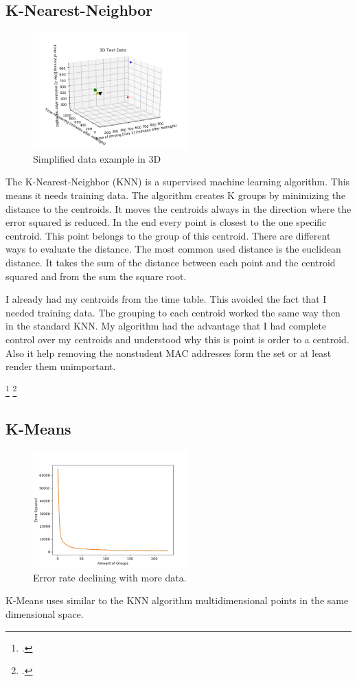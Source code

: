 \documentclass[11pt]{article}
\begin{document}
\subsection{K-Nearest-Neighbor}

\begin{figure}
\centering
\includegraphics [width = 6cm]{images/3Dploting.png}
\caption{Simplified data example in 3D\label{fig:3dploting}}
\end{figure}

The K-Nearest-Neighbor (KNN)  is a supervised machine learning algorithm. This means it needs training data. The algorithm creates K groups by minimizing the distance to the centroids. It moves the centroids always in the direction where the error squared is reduced. In the end every point is closest to the one specific centroid. This point belongs to the group of this centroid. There are different ways to evaluate the distance. The most common used distance is the euclidean distance. It takes the sum of the distance between each point and the centroid squared and from the sum the square root.

I already had my centroids from the time table. This avoided the fact that I needed training data. The grouping to each centroid worked the same way then in the standard KNN. My algorithm had the advantage that I had complete control over my centroids and understood why this is point is order to a centroid. Also it help removing the nonstudent MAC addresses form the set or at least render them unimportant.  


\footcite{datasciencefromscratch}
\footcite[P. 305]{dataalgorithms}
\subsection{K-Means}
\begin{figure}
\centering
\includegraphics [width = 6cm]{images/groupstoerror.png}
\caption{Error rate declining with more data.\label{errorwithtime}}
\end{figure}
K-Means uses similar to the KNN algorithm multidimensional points in the same dimensional space. 
\end{document}
